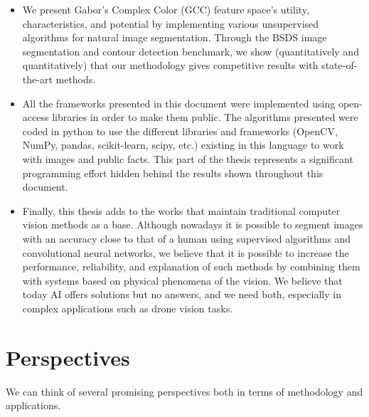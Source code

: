 \begin{itemize}
	\item We present Gabor's Complex Color (GCC) feature space's utility, characteristics, and potential by implementing various unsupervised algorithms for natural image segmentation. Through the BSDS image segmentation and contour detection benchmark, we show (quantitatively and quantitatively) that our methodology gives competitive results with state-of-the-art methods.
	\item All the frameworks presented in this document were implemented using open-access libraries in order to make them public. The algorithms presented were coded in python to use the different libraries and frameworks (OpenCV, NumPy, pandas, scikit-learn, scipy, etc.) existing in this language to work with images and public facts. This part of the thesis represents a significant programming effort hidden behind the results shown throughout this document.
	\item Finally, this thesis adds to the works that maintain traditional computer vision methods as a base. Although nowadays it is possible to segment images with an accuracy close to that of a human using supervised algorithms and convolutional neural networks, we believe that it is possible to increase the performance, reliability, and explanation of such methods by combining them with systems based on physical phenomena of the vision. We believe that today AI offers solutions but no answers, and we need both, especially in complex applications such as drone vision tasks.
\end{itemize}


\section{Perspectives}
We can think of several promising perspectives both in terms of methodology and applications.

